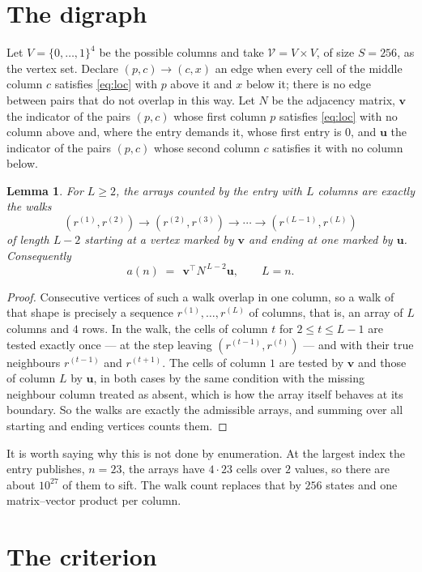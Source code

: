 \documentclass[11pt,a4paper]{article}
\theoremstyle{plain}
\newtheorem{lemma}[theorem]{Lemma}
\theoremstyle{definition}
\begin{document}
\section{The digraph}

Let $V=\{0,\dots,1\}^{4}$ be the possible columns and take
$\mathcal V=V\times V$, of size $S=256$, as the vertex set. Declare $(p,c)\to(c,x)$ an edge
when every cell of the middle column $c$ satisfies \eqref{eq:loc} with $p$ above it and $x$
below it; there is no edge between pairs that do not overlap in this way. Let $N$ be the
adjacency matrix, $\mathbf{v}$ the indicator of the pairs $(p,c)$ whose first column $p$
satisfies \eqref{eq:loc} with no column above and, where the entry demands it, whose first entry is $0$, and $\mathbf{u}$ the indicator of
the pairs $(p,c)$ whose second column $c$ satisfies it with no column below.

\begin{lemma}\label{lem:walk}
For $L\ge2$, the arrays counted by the entry with $L$ columns are exactly the walks
\[
(r^{(1)},r^{(2)})\to(r^{(2)},r^{(3)})\to\cdots\to(r^{(L-1)},r^{(L)})
\]
of length $L-2$ starting at a vertex marked by $\mathbf{v}$ and ending at one marked by
$\mathbf{u}$. Consequently
\[
a(n)\;=\;\,\mathbf{v}^{\!\top}N^{\,L-2}\mathbf{u},\qquad L=n .
\]
\end{lemma}

\begin{proof}
Consecutive vertices of such a walk overlap in one column, so a walk of that shape is
precisely a sequence $r^{(1)},\dots,r^{(L)}$ of columns, that is, an array of $L$ columns
and $4$ rows. In the walk, the cells of column $t$ for $2\le t\le L-1$ are tested
exactly once --- at the step leaving $(r^{(t-1)},r^{(t)})$ --- and with their true
neighbours $r^{(t-1)}$ and $r^{(t+1)}$. The cells of column $1$ are tested by
$\mathbf{v}$ and those of column $L$ by $\mathbf{u}$, in both cases by the same condition
with the missing neighbour column treated as absent, which is how the array itself behaves at
its boundary. So the walks are exactly the admissible arrays, and summing over all starting
and ending vertices counts them.
\end{proof}


It is worth saying why this is not done by enumeration. At the largest index the entry
publishes, $n=23$, the arrays have $4\cdot23$ cells over
$2$ values, so there are about $10^{27}$ of them to sift. The
walk count replaces that by $256$ states and one matrix--vector product per column.
\section{The criterion}
\end{document}
